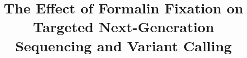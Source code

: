 \documentclass{bmcart}
\begin{document}
\begin{frontmatter}

\begin{fmbox}


\title{The Effect of Formalin Fixation on Targeted Next-Generation Sequencing and Variant Calling}


\author[
   addressref={aff1},                   %
   email={eyap@bcgsc.ca}   %
]{ }
\author[
   addressref={aff1,aff2},
	 corref={aff1},                       %
   email={akarsan@bcgsc.ca}
]{ }


\address[id=aff1]{%
  , %
  ,                     %
  ,                           %
}
\address[id=aff2]{%
  ,
  ,
  ,
}


\end{fmbox}
\end{frontmatter}
\end{document}
